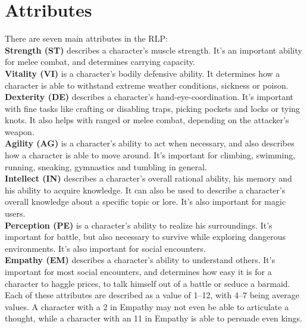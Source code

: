 \section{Attributes}\label{sec:stats}
There are seven main attributes in the RLP:\\

\textbf{Strength (ST)}\label{stat:strength} describes a character's muscle strength.
It's an important ability for melee combat, and determines carrying capacity.\\


\textbf{Vitality (VI)}\label{stat:vitality} is a character's bodily defensive ability.
It determines how a character is able to withstand extreme weather conditions, sickness or poison.\\


\textbf{Dexterity (DE)}\label{stat:dexterity} describes a character's hand-eye-coordination.
It's important with fine tasks like crafting or disabling traps, picking pockets and locks or tying knots.
It also helps with ranged or melee combat, depending on the attacker's weapon.\\


\textbf{Agility (AG)}\label{stat:agility} is a character's ability to act when necessary, and also describes how a character is able to move around.
It's important for climbing, swimming, running, sneaking, gymnastics and tumbling in general.\\


\textbf{Intellect (IN)}\label{stat:intellect} describes a character's overall rational ability, his memory and his ability to acquire knowledge.
It can also be used to describe a character's overall knowledge about a specific topic or lore.
It's also important for magic users.\\


\textbf{Perception (PE)}\label{stat:perception} is a character's ability to realize his surroundings.
It's important for battle, but also necessary to survive while exploring dangerous environments.
It's also important for social encounters.\\


\textbf{Empathy (EM)}\label{stat:empathy} describes a character's ability to understand others.
It's important for most social encounters, and determines how easy it is for a character to haggle prices, to talk himself out of a battle or seduce a barmaid.\\
Each of these attributes are described as a value of 1--12, with 4--7 being average values.
A character with a 2 in Empathy may not even be able to articulate a thought, while a character with an 11 in Empathy is able to persuade even kings.